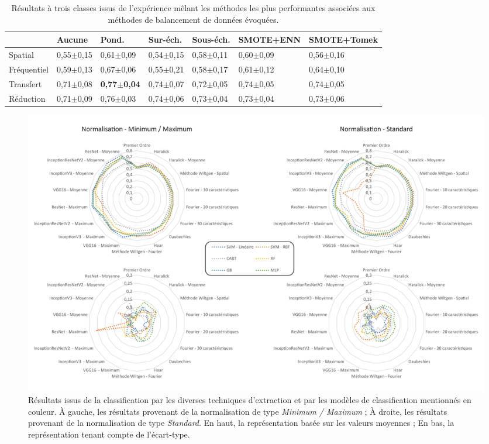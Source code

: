 \begin{table}[H]
    \begin{tabular}{lllllll}
        \toprule
                    & Aucune        & Pond.                 & Sur-éch.      & Sous-éch.     & SMOTE+ENN     & SMOTE+Tomek   \\ \hline
        Spatial     & 0,55$\pm$0,15 & 0,61$\pm$0,09         & 0,54$\pm$0,15 & 0,58$\pm$0,11 & 0,60$\pm$0,09 & 0,56$\pm$0,16 \\
        Fréquentiel & 0,59$\pm$0,13 & 0,67$\pm$0,06         & 0,55$\pm$0,21 & 0,58$\pm$0,17 & 0,61$\pm$0,12 & 0,64$\pm$0,10 \\ \rowcolor[HTML]{E7E6E6}
        Transfert   & 0,71$\pm$0,08 & \textbf{0,77$\pm$0,04}& 0,74$\pm$0,07 & 0,72$\pm$0,05 & 0,74$\pm$0,05 & 0,74$\pm$0,05 \\
        Réduction   & 0,71$\pm$0,09 & 0,76$\pm$0,03         & 0,74$\pm$0,06 & 0,73$\pm$0,04 & 0,73$\pm$0,04 & 0,73$\pm$0,06 \\ \bottomrule
    \end{tabular}
    \caption{Résultats à trois classes issus de l'expérience mêlant les méthodes les plus performantes associées aux méthodes de balancement de données évoquées.}
    \label{tab:results_balancement_multi}
\end{table}\par

\begin{landscape}
    \begin{figure}[H]
        \centering
        \includegraphics[width=0.9\linewidth]{contents/chapter_5/resources/results_image_classification.pdf}    
        \caption{Résultats issus de la classification par les diverses techniques d'extraction et par les modèles de classification mentionnés en couleur. À gauche, les résultats provenant de la normalisation de type \textit{Minimum / Maximum} ; À droite, les résultats provenant de la normalisation de type \textit{Standard}. En haut, la représentation basée sur les valeurs moyennes ; En bas, la représentation tenant compte de l'écart-type.}
        \label{fig:results_image_classification}
    \end{figure}
\end{landscape}


